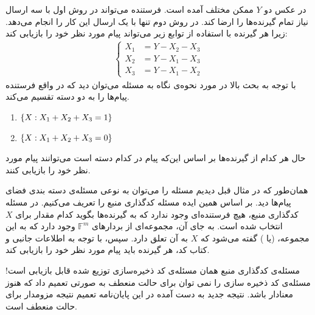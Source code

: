 \begin{example}
\begin{minipage}{0.5\textwidth}
	\end{minipage}
	\newline
	 در عکس دو $Y$ ممکن مختلف آمده است. فرستنده می‌تواند در روش اول با سه ارسال نیاز تمام گیرنده‌ها را ارضا کند. در روش دوم تنها با یک ارسال این کار را انجام می‌دهد. زیرا هر گیرنده با استفاده از توابع زیر می‌تواند پیام مورد نظر خود را بازیابی کند:
	\begin{align*}
		\begin{cases}
				X_1 &= Y - X_2 - X_3 \\
				X_2 &= Y - X_1 - X_3  \\
				X_3 &= Y - X_1 - X_2  
			\end{cases}   
	\end{align*}
	با توجه به بحث بالا در مورد نحوه‌ی نگاه به مسئله می‌توان دید که در واقع فرستنده پیام‌ها را به دو دسته تقسیم می‌کند.
		\begin{enumerate}
			\centering
			\item $\left\{ X: X_1 + X_2 + X_3 = 1 \right\}$
			\item $\left\{ X: X_1 + X_2 + X_3 = 0 \right\}$
		\end{enumerate}
	حال هر کدام از گیرنده‌ها بر اساس این‌که پیام در کدام دسته است می‌توانند پیام مورد نظر خود را بازیابی کنند.
\end{example}

همان‌طور که در مثال قبل دیدیم مسئله 
\icod
 را می‌توان به نوعی مسئله‌ی دسته بندی فضای پیام‌ها دید. بر اساس همین ایده مسئله کدگذاری منبع را تعریف می‌کنیم. در مسئله کدگذاری منبع، هیچ فرستنده‌ای وجود ندارد که به گیرنده‌ها بگوید کدام مقدار برای $X$ انتخاب شده است. به جای آن، مجموعه‌ای از بردارهای
  $\mathbb{F}^m$
   وجود دارد که به این مجموعه،
 (یا 
 )
 گفته می‌شود که $X$ به آن تعلق دارد. سپس، با توجه به اطلاعات جانبی و کتاب کد، هر گیرنده باید پیام مورد نظر خود را بازیابی کند.
\begin{observation}
	مسئله‌ی کدگذاری منبع همان مسئله‌ی کد ذخیره‌سازی توزیع شده قابل بازیابی است! مسئله‌ی کد ذخیره سازی را نمی توان برای حالت منعطف به صورتی تعمیم داد که هنوز معنادار باشد. نتیجه جدید به دست آمده در این پایان‌نامه تعمیم نتیجه مزومدار برای حالت منعطف است.
\end{observation}

